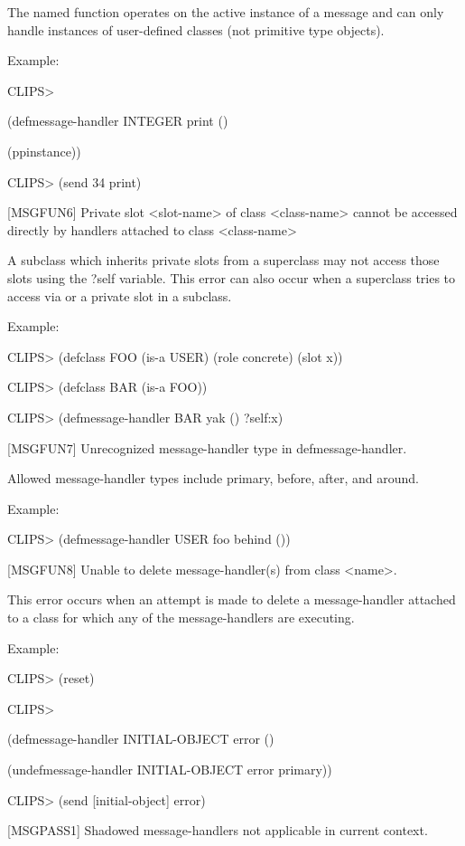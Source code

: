 \documentclass[letterpaper,10pt,english]{sphinxmanual}
\begin{document}
The named function operates on the active instance of a message and can
only handle instances of user-defined classes (not primitive type
objects).

Example:

CLIPS\textgreater{}

(defmessage-handler INTEGER print ()

(ppinstance))

CLIPS\textgreater{} (send 34 print)

{[}MSGFUN6{]} Private slot \textless{}slot-name\textgreater{} of class \textless{}class-name\textgreater{} cannot be
accessed directly by handlers attached to class \textless{}class-name\textgreater{}

A subclass which inherits private slots from a superclass may not access
those slots using the ?self variable. This error can also occur when a
superclass tries to access via  or  a
private slot in a subclass.

Example:

CLIPS\textgreater{} (defclass FOO (is-a USER) (role concrete) (slot x))

CLIPS\textgreater{} (defclass BAR (is-a FOO))

CLIPS\textgreater{} (defmessage-handler BAR yak () ?self:x)

{[}MSGFUN7{]} Unrecognized message-handler type in defmessage-handler.

Allowed message-handler types include primary, before, after, and
around.

Example:

CLIPS\textgreater{} (defmessage-handler USER foo behind ())

{[}MSGFUN8{]} Unable to delete message-handler(s) from class \textless{}name\textgreater{}.

This error occurs when an attempt is made to delete a message-handler
attached to a class for which any of the message-handlers are executing.

Example:

CLIPS\textgreater{} (reset)

CLIPS\textgreater{}

(defmessage-handler INITIAL-OBJECT error ()

(undefmessage-handler INITIAL-OBJECT error primary))

CLIPS\textgreater{} (send {[}initial-object{]} error)

{[}MSGPASS1{]} Shadowed message-handlers not applicable in current context.
\end{document}
